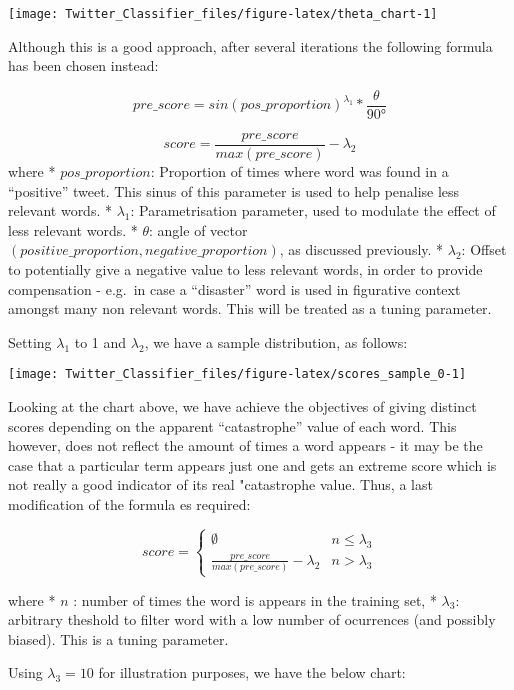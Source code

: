 \documentclass[11pt,]{article}
\begin{document}
\begin{center}\texttt{[image: Twitter\_Classifier\_files/figure-latex/theta\_chart-1]} \end{center}

Although this is a good approach, after several iterations the following
formula has been chosen instead:

\[pre\_score = sin(pos\_proportion)^{\lambda_1}*\frac{\theta}{90 \si{\degree} }\]

\[score = \frac{pre\_score}{max(pre\_score)} - \lambda_2\] where *
\(pos\_proportion\): Proportion of times where word was found in a
``positive'' tweet. This sinus of this parameter is used to help
penalise less relevant words. * \(\lambda_1\): Parametrisation
parameter, used to modulate the effect of less relevant words. *
\(\theta\): angle of vector
\((positive\_proportion,negative\_proportion)\), as discussed
previously. * \(\lambda_2\): Offset to potentially give a negative value
to less relevant words, in order to provide compensation - e.g.~in case
a ``disaster'' word is used in figurative context amongst many non
relevant words. This will be treated as a tuning parameter.

Setting \(\lambda_1\) to 1 and \(\lambda_2\), we have a sample
distribution, as follows:

\begin{center}\texttt{[image: Twitter\_Classifier\_files/figure-latex/scores\_sample\_0-1]} \end{center}

Looking at the chart above, we have achieve the objectives of giving
distinct scores depending on the apparent ``catastrophe'' value of each
word. This however, does not reflect the amount of times a word appears
- it may be the case that a particular term appears just one and gets an
extreme score which is not really a good indicator of its real
"catastrophe value. Thus, a last modification of the formula es
required:

\[score = 
 \begin{cases} 
      \emptyset & n \leq \lambda_3 \\
      \frac{pre\_score}{max(pre\_score)} - \lambda_2 & n > \lambda_3
   \end{cases}\]

where * \(n\) : number of times the word is appears in the training set,
* \(\lambda_3\): arbitrary theshold to filter word with a low number of
ocurrences (and possibly biased). This is a tuning parameter.

Using \(\lambda_3=10\) for illustration purposes, we have the below
chart:
\end{document}
